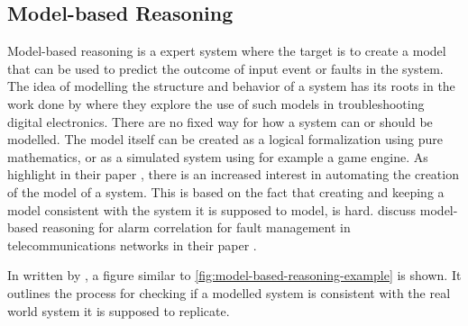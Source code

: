 \subsection{Model-based Reasoning}
Model-based reasoning is a expert system where the target is to create a model that can be used to predict the outcome of input event or faults in the system. The idea of modelling the structure and behavior of a system has its roots in the work done by \textcite{davies_1987} where they explore the use of such models in troubleshooting digital electronics.  There are no fixed way for how a system can or should be modelled. The model itself can be created as a logical formalization using pure mathematics, or as a simulated system using for example a game engine. As \textcite{Dodig-Crnkovic2017} highlight in their paper , there is an increased interest in automating the creation of the model of a system. This is based on the fact that creating and keeping a model consistent with the system it is supposed to model, is hard.
\textcite{jakobson_1993} discuss model-based reasoning for alarm correlation for fault management in telecommunications networks in their paper .

In  written by \textcite{poll_2003}, a figure similar to \ref{fig:model-based-reasoning-example} is shown. It outlines the process for checking if a modelled system is consistent with the real world system it is supposed to replicate.

